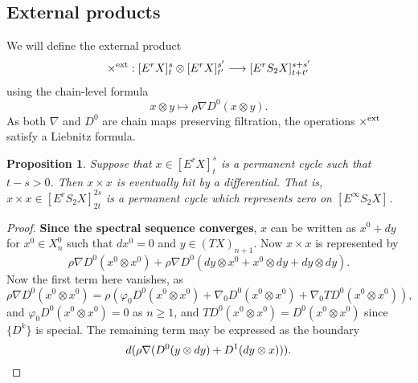\documentclass[11pt]{amsart}
\theoremstyle{plain}
\newtheorem{prop}[thm]{Proposition}
\theoremstyle{definition}
\let\phi\varphi
\renewcommand{\to}{\longrightarrow}
\theoremstyle{plain}
\newcommand{\Nabla}{\nabla}
\newcommand{\E}[5]{[E^{#1}_{#2}#3]^{#4}_{#5}}
\begin{document}
\begin{second quadrant homotopy}
\subsection{External products}
We will define the external product
\[\times^\textup{ext}:\E{r}{}{X}{s}{t}\otimes \E{r}{}{X}{s'}{t'}\to \E{r}{}{S_2X}{s+s'}{t+t'}\]
using the chain-level formula
\[x\otimes y\mapsto\rho\Nabla D^0(x\otimes y).\]
As both $\Nabla$ and $D^0$ are chain maps preserving filtration, the operations $\times^\textup{ext}$ satisfy a Liebnitz formula.
\begin{prop}
Suppose that $x\in \E{r}{}{X}{s}{t}$ is a permanent cycle such that $t-s>0$. Then $x\times x$ is eventually hit by a differential. That is, $x\times x\in \E{r}{}{S_2X}{2s}{2t}$ is a permanent cycle which represents zero on $\E{\infty}{}{S_2X}{}{}$.
\end{prop}
\begin{proof}
\textbf{Since the spectral sequence converges}, $x$ can be written as $x^0+dy$ for $x^0\in X^{0}_{n}$ such that $dx^0=0$ and $y\in (TX)_{n+1}$. Now $x\times x$ is represented by
\[\rho\Nabla D^0(x^0\otimes x^0)+\rho\Nabla D^0(dy\otimes x^0+x^0\otimes dy+dy\otimes dy).\]
Now the first term here vanishes, as
\[\rho\Nabla D^0(x^0\otimes x^0)=\rho(\phi_0 D^0(x^0\otimes x^0)+\Nabla_0 D^0(x^0\otimes x^0)+\Nabla_0 TD^0(x^0\otimes x^0)),\]
and $\phi_0D^0(x^0\otimes x^0)=0$ as $n\geq1$, and $TD^0(x^0\otimes x^0)=D^0(x^0\otimes x^0)$ since $\{D^k\}$ is special. The remaining term may be expressed as the boundary
\[d(\rho\Nabla(D^0(y\otimes dy)+D^1(dy\otimes x))).\qedhere\]
\end{proof}

\end{second quadrant homotopy}
\end{document}
